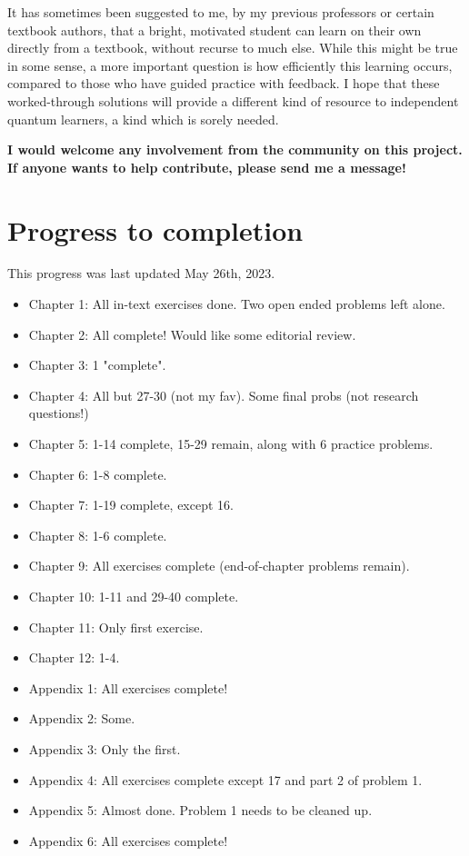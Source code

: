\documentclass{book}
\begin{document}
It has sometimes been suggested to me, by my previous professors or certain textbook authors, that a bright, motivated student can learn on their own directly from a textbook, without recurse to much else. While this might be true in some sense, a more important question is how efficiently this learning occurs, compared to those who have guided practice with feedback. I hope that these worked-through solutions will provide a different kind of resource to independent quantum learners, a kind which is sorely needed.

\textbf{I would welcome any involvement from the community on this project. If anyone wants to help contribute, please send me a message!}

\section{Progress to completion}

This progress was last updated May 26th, 2023.

\begin{itemize}
    \item Chapter 1: All in-text exercises done. Two open ended problems left alone.
    \item Chapter 2: All complete! Would like some editorial review.
    \item Chapter 3: 1 "complete".
    \item Chapter 4: All but 27-30 (not my fav). Some final probs (not research questions!)
    \item Chapter 5: 1-14 complete, 15-29 remain, along with 6 practice problems.
    \item Chapter 6: 1-8 complete.
    \item Chapter 7: 1-19 complete, except 16.
    \item Chapter 8: 1-6 complete.
    \item Chapter 9: All exercises complete (end-of-chapter problems remain).
    \item Chapter 10: 1-11 and 29-40 complete.
    \item Chapter 11: Only first exercise.
    \item Chapter 12: 1-4.
    \item Appendix 1: All exercises complete!
    \item Appendix 2: Some.
    \item Appendix 3: Only the first.
    \item Appendix 4: All exercises complete except 17 and part 2 of problem 1.
    \item Appendix 5: Almost done. Problem 1 needs to be cleaned up. 
    \item Appendix 6: All exercises complete!
\end{itemize}
\end{document}
